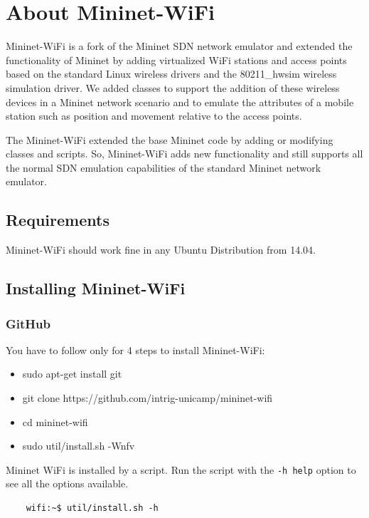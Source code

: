 \chapter{About Mininet-WiFi}

Mininet-WiFi is a fork of the Mininet SDN network emulator and extended the functionality of Mininet by adding virtualized WiFi stations and access points based on the standard Linux wireless drivers and the 80211\_hwsim wireless simulation driver. We added classes to support the addition of these wireless devices in a Mininet network scenario and to emulate the attributes of a mobile station such as position and movement relative to the access points.

The Mininet-WiFi extended the base Mininet code by adding or modifying classes and scripts. So, Mininet-WiFi adds new functionality and still supports all the normal SDN emulation capabilities of the standard Mininet network emulator.


\section{Requirements}

Mininet-WiFi should work fine in any Ubuntu Distribution from 14.04.

\section{Installing Mininet-WiFi}

\subsection{GitHub}
You have to follow only for 4 steps to install Mininet-WiFi:

\begin{itemize}
\item sudo apt-get install git
\item git clone https://github.com/intrig-unicamp/mininet-wifi
\item cd mininet-wifi
\item sudo util/install.sh -Wnfv\\
\end{itemize}

Mininet WiFi is installed by a script. Run the script with the \texttt{-h help} option to see all the options available.

\begin{verbatim}
    wifi:~$ util/install.sh -h
\end{verbatim}

